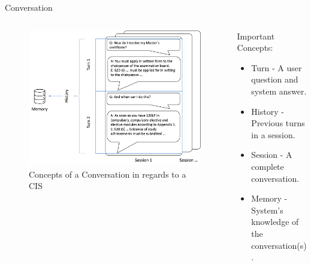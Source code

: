 \documentclass{beamer}
\begin{document}
\begin{frame}{Conversation}
  
  \begin{columns}[t] %
    \begin{column}{.6\textwidth}
      \vfill
      \begin{figure}
        \includegraphics[width=\textwidth]{Grafiken/Conversation_Explain.png}
        \caption{Concepts of a Conversation in regards to a CIS}
      \end{figure}
      \vfill
    \end{column}
    
    \begin{column}{.4\textwidth}
      \vfill
      Important Concepts:
      \begin{itemize}
        \item Turn - A user question and system answer.
        \item History - Previous turns in a session.
        \item Session - A complete conversation.
        \item Memory - System's knowledge of the conversation(s).
      \end{itemize}
      \vfill
    \end{column}
  \end{columns}

\end{frame}
\end{document}
